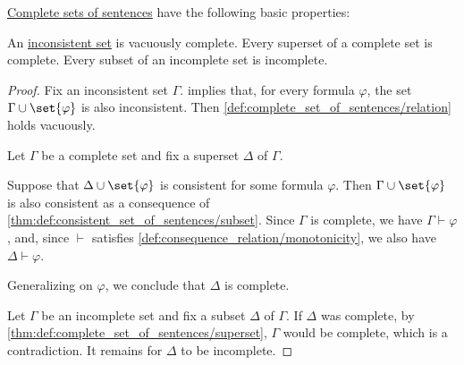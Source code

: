 \begin{proposition}\label{thm:def:complete_set_of_sentences}
  \hyperref[def:complete_set_of_sentences]{Complete sets of sentences} have the following basic properties:
  \begin{thmenum}
     An \hyperref[def:consistent_set_of_sentences]{inconsistent set} is vacuously complete.
     Every superset of a complete set is complete.
     Every subset of an incomplete set is incomplete.
  \end{thmenum}
\end{proposition}
\begin{proof}
   Fix an inconsistent set \( \Gamma \).  implies that, for every formula \( \varphi \), the set \( \Gamma \cup \set{ \varphi } \) is also inconsistent. Then \cref{def:complete_set_of_sentences/relation} holds vacuously.

   Let \( \Gamma \) be a complete set and fix a superset \( \Delta \) of \( \Gamma \).

  Suppose that \( \Delta \cup \set{ \varphi } \) is consistent for some formula \( \varphi \). Then \( \Gamma \cup \set{ \varphi } \) is also consistent as a consequence of \cref{thm:def:consistent_set_of_sentences/subset}. Since \( \Gamma \) is complete, we have \( \Gamma \vdash \varphi \), and, since \( {\vdash} \) satisfies \cref{def:consequence_relation/monotonicity}, we also have \( \Delta \vdash \varphi \).

  Generalizing on \( \varphi \), we conclude that \( \Delta \) is complete.

   Let \( \Gamma \) be an incomplete set and fix a subset \( \Delta \) of \( \Gamma \). If \( \Delta \) was complete, by \cref{thm:def:complete_set_of_sentences/superset}, \( \Gamma \) would be complete, which is a contradiction. It remains for \( \Delta \) to be incomplete.
\end{proof}

